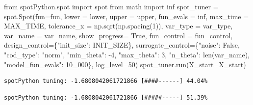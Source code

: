 \documentclass[
  letterpaper,
  DIV=11,
  numbers=noendperiod]{scrreprt}
\newenvironment{Shaded}{\begin{snugshade}}{\end{snugshade}}
\newcommand{\BuiltInTok}[1]{\textcolor[rgb]{0.00,0.23,0.31}{#1}}
\newcommand{\DecValTok}[1]{\textcolor[rgb]{0.68,0.00,0.00}{#1}}
\newcommand{\ImportTok}[1]{\textcolor[rgb]{0.00,0.46,0.62}{#1}}
\newcommand{\NormalTok}[1]{\textcolor[rgb]{0.00,0.23,0.31}{#1}}
\newcommand{\OperatorTok}[1]{\textcolor[rgb]{0.37,0.37,0.37}{#1}}
\newcommand{\StringTok}[1]{\textcolor[rgb]{0.13,0.47,0.30}{#1}}
\newcommand{\VariableTok}[1]{\textcolor[rgb]{0.07,0.07,0.07}{#1}}
\begin{document}
\begin{Shaded}
\begin{Highlighting}[]
\ImportTok{from}\NormalTok{ spotPython.spot }\ImportTok{import}\NormalTok{ spot}
\ImportTok{from}\NormalTok{ math }\ImportTok{import}\NormalTok{ inf}
\NormalTok{spot\_tuner }\OperatorTok{=}\NormalTok{ spot.Spot(fun}\OperatorTok{=}\NormalTok{fun,}
\NormalTok{                   lower }\OperatorTok{=}\NormalTok{ lower,}
\NormalTok{                   upper }\OperatorTok{=}\NormalTok{ upper,}
\NormalTok{                   fun\_evals }\OperatorTok{=}\NormalTok{ inf,}
\NormalTok{                   max\_time }\OperatorTok{=}\NormalTok{ MAX\_TIME,}
\NormalTok{                   tolerance\_x }\OperatorTok{=}\NormalTok{ np.sqrt(np.spacing(}\DecValTok{1}\NormalTok{)),}
\NormalTok{                   var\_type }\OperatorTok{=}\NormalTok{ var\_type,}
\NormalTok{                   var\_name }\OperatorTok{=}\NormalTok{ var\_name,}
\NormalTok{                   show\_progress}\OperatorTok{=} \VariableTok{True}\NormalTok{,}
\NormalTok{                   fun\_control }\OperatorTok{=}\NormalTok{ fun\_control,}
\NormalTok{                   design\_control}\OperatorTok{=}\NormalTok{\{}\StringTok{"init\_size"}\NormalTok{: INIT\_SIZE\},}
\NormalTok{                   surrogate\_control}\OperatorTok{=}\NormalTok{\{}\StringTok{"noise"}\NormalTok{: }\VariableTok{False}\NormalTok{,}
                                      \StringTok{"cod\_type"}\NormalTok{: }\StringTok{"norm"}\NormalTok{,}
                                      \StringTok{"min\_theta"}\NormalTok{: }\OperatorTok{{-}}\DecValTok{4}\NormalTok{,}
                                      \StringTok{"max\_theta"}\NormalTok{: }\DecValTok{3}\NormalTok{,}
                                      \StringTok{"n\_theta"}\NormalTok{: }\BuiltInTok{len}\NormalTok{(var\_name),}
                                      \StringTok{"model\_fun\_evals"}\NormalTok{: }\DecValTok{10\_000}\NormalTok{\},}
\NormalTok{                                      log\_level}\OperatorTok{=}\DecValTok{50}\NormalTok{)}
\NormalTok{spot\_tuner.run(X\_start}\OperatorTok{=}\NormalTok{X\_start)}
\end{Highlighting}
\end{Shaded}

\begin{verbatim}
spotPython tuning: -1.6808042061721866 [####------] 44.04% 
\end{verbatim}

\begin{verbatim}
spotPython tuning: -1.6808042061721866 [#####-----] 51.39% 
\end{verbatim}
\end{document}
